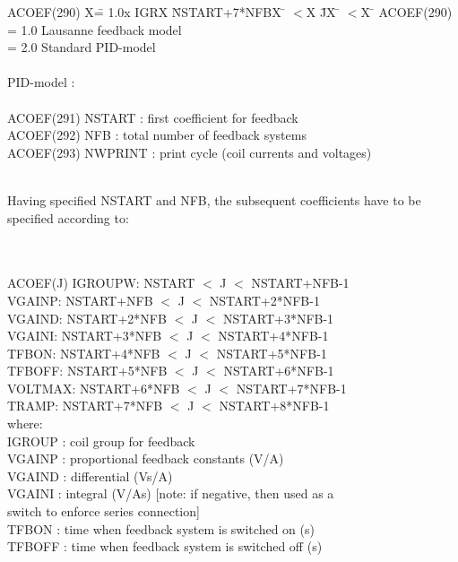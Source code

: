 \begin{tabbing}
ACOEF(290) X\= = 1.0x IGRX \= NSTART+7*NFBX \= $<$X \= JX \= $<$X \= \kill
ACOEF(290) \> = 1.0 Lausanne feedback model \\
           \> = 2.0 Standard PID-model \\
 \\
PID-model :\\
 \\
ACOEF(291) \> NSTART : first coefficient for feedback\\
ACOEF(292) \> NFB : total number of feedback systems\\
ACOEF(293) \> NWPRINT : print cycle (coil currents and voltages)\\
 \\
\parbox[t]{\textwidth}{Having specified NSTART and NFB, the subsequent coefficients have to
be specified according to:} \\
 \\
ACOEF(J) \> IGROUPW: \> NSTART       \> $<$  \> J  \> $<$ \> NSTART+NFB-1 \\
         \> VGAINP:  \> NSTART+NFB   \> $<$  \> J  \> $<$ \> NSTART+2*NFB-1\\
         \> VGAIND:  \> NSTART+2*NFB \> $<$  \> J  \> $<$ \> NSTART+3*NFB-1\\
         \> VGAINI:  \> NSTART+3*NFB \> $<$  \> J  \> $<$ \> NSTART+4*NFB-1\\
         \> TFBON:  \> NSTART+4*NFB \> $<$  \> J  \> $<$ \> NSTART+5*NFB-1\\
         \> TFBOFF:  \> NSTART+5*NFB \> $<$  \> J  \> $<$ \> NSTART+6*NFB-1\\
         \> VOLTMAX:  \> NSTART+6*NFB \> $<$  \> J  \> $<$ \> NSTART+7*NFB-1\\
         \> TRAMP:  \> NSTART+7*NFB \> $<$  \> J  \> $<$ \> NSTART+8*NFB-1\\
where:\\
\>  IGROUP : \> coil group for feedback \\
\> VGAINP : \> proportional feedback constants (V/A) \\
\> VGAIND : \> differential (Vs/A)\\
\>  VGAINI : \> integral (V/As)   [note: if negative, then used as a \\
\> \> switch to enforce series connection]  \\
\>  TFBON : \> time when feedback system is switched on (s)\\
\>  TFBOFF : \> time when feedback system is switched off (s)\\

\end{tabbing}
